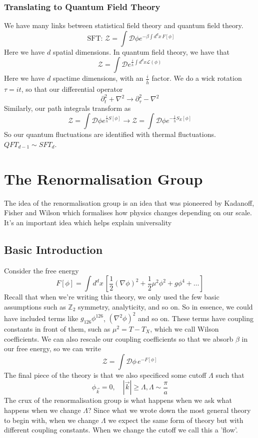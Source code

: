 \documentclass[11pt, oneside]{article}   	%
\begin{document}
\subsubsection{Translating to Quantum Field Theory} 
We have many links between statistical field theory and
quantum field theory. 
\[
	\text{ SFT:  } \mathcal{  Z} = \int \mathcal{ D } \phi e^{ - \beta \int d^ d x \, F [ \phi ] }
\]  Here we have $ d $ spatial dimensions. 
In quantum field theory, 
we have that 
\[
	\mathcal{ Z } = \int \mathcal{ D } e^{ \frac{i}{\overline{h} } \int d^ d x \mathcal{ L ( \phi ) }}
\] Here we have $ d $ spactime dimensions, with an $ \frac{i}{\overline{h} }$ factor. 
We do a wick rotation $ \tau = i t $, 
so that our differential operator 
 \[
 \partial  _ t^ 2 +  \nabla ^ 2 \to \partial _ \tau ^ 2 - \nabla ^ 2 
\] Similarly, our path integrals transform as 
\[
	\mathcal{ Z  } = \int \mathcal{ D } \phi e^{ \frac{i}{\overline{h} } S [ \phi ]  } \to \mathcal{ Z } = \int \mathcal{ D } \phi e ^{ - \frac{1}{\overline{h}  } S_{ E } [ \phi ] }
\] So our quantum fluctuations are identified with thermal fluctuations.
$QFT_{ d -1 } \sim SFT_d $. 
\pagebreak 

\section{The Renormalisation Group}%
\label{sec:the_renormalisation_group}
The idea of the renormalisation group is an idea that 
was pioneered by Kadanoff, Fisher and Wilson which formalises
how physics changes depending on our scale. It's an important idea 
which helps explain universality

\subsection{Basic Introduction} 
Consider the free energy 
\[
	F [ \phi ] = \int d^ d x\,  \left[  \frac{1}{2 } ( \nabla \phi ) ^ 2 + \frac{1}{2 } \mu ^ 2 \phi ^ 2 + g \phi ^ 4 + \dots  \right] 
\] Recall that when we're writing this theory, 
we only used the few basic assumptions such as $ \mathbb{ Z} _ 2 $ symmetry, 
analyticity, and so on. 
So in essence, we could have included terms like 
$ g _{ 126} \phi ^{ 126 } $,  $ ( \nabla ^ 2 \phi ) ^ 2 $ and so on. 
These terms have coupling constants in front of them, 
such as $ \mu ^ 2 = T - T _ X $, which we call Wilson coefficients. 
We can also rescale our coupling coefficients so that we 
absorb $ \beta $ in our free energy, so we can write 
\[
	\mathcal{Z  } = \int \mathcal{ D } \phi \, e ^{  - F [ \phi ] }
\]  The final piece of the theory is that we also 
specificed some cutoff $ \Lambda $ such that 
\[
 \phi _{ \vec{k} } =0 , \quad  |  \vec{k} |  \geq \Lambda, \Lambda \sim \frac{\pi}{ a }
\] The crux of the renormalisation group 
is what happens when we ask what happens when we change $ \Lambda $? 
Since what we wrote down the most general theory to begin with, 
when we change  $ \Lambda  $ we expect the same form of theory 
but with different coupling constants. 
When we change the cutoff we call this a 'flow'. 
\end{document}
